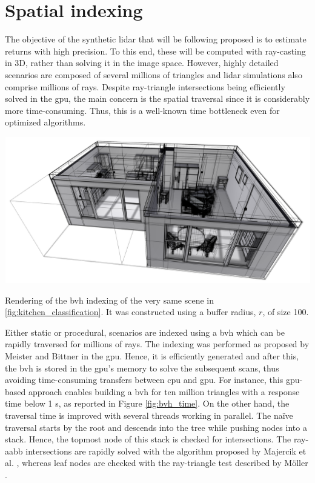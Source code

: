\section{Spatial indexing}

The objective of the synthetic \acrshort{lidar} that will be following proposed is to estimate returns with high precision. To this end, these will be computed with ray-casting in 3D, rather than solving it in the image space. However, highly detailed scenarios are composed of several millions of triangles and \acrshort{lidar} simulations also comprise millions of rays. Despite ray-triangle intersections being efficiently solved in the \acrshort{gpu}, the main concern is the spatial traversal since it is considerably more time-consuming. Thus, this is a well-known time bottleneck even for optimized algorithms. 

\begin{marginfigure}[.cm]
    \centering
    \includegraphics[width=\linewidth]{figs/lidar_simulation/bvh_rendering.png}
	\caption{Rendering of the \acrshort{bvh} indexing of the very same scene in \ref{fig:kitchen_classification}. It was constructed using a buffer radius, $r$, of size 100.}
	\label{fig:lidar_bvh_rendering}
\end{marginfigure}
Either static or procedural, scenarios are indexed using a \acrshort{bvh} which can be rapidly traversed for millions of rays. The indexing was performed as proposed by Meister and Bittner \cite{meister_parallel_2018} in the \acrshort{gpu}. Hence, it is efficiently generated and after this, the \acrshort{bvh} is stored in the \acrshort{gpu}'s memory to solve the subsequent scans, thus avoiding time-consuming transfers between \acrshort{cpu} and \acrshort{gpu}. For instance, this \acrshort{gpu}-based approach enables building a \acrshort{bvh} for ten million triangles with a response time below 1 \si{\second}, as reported in Figure \ref{fig:bvh_time}. On the other hand, the traversal time is improved with several threads working in parallel. The naïve traversal starts by the root and descends into the tree while pushing nodes into a stack. Hence, the topmost node of this stack is checked for intersections. The ray-\acrshort{aabb} intersections are rapidly solved with the algorithm proposed by Majercik et al. \cite{majercik_ray-box_2018}, whereas leaf nodes are checked with the ray-triangle test described by Möller \cite{moller_fast_1997}.

